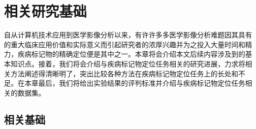 \chapter{相关研究基础}
自从计算机技术应用到医学影像分析以来，有许许多多医学影像分析难题因其具有的重大临床应用价值和实际意义而引起研究者的浓厚兴趣并为之投入大量时间和精力，疾病标记物的精确定位便是其中之一。本章将会介绍本文后续内容涉及到的基本知识点。接着，我们将会介绍与疾病标记物定位任务相关的研究进展，力求将相关方法阐述得清晰明了，突出比较各种方法在疾病标记物定位任务上的长处和不足。在本章最后，我们将给出实验结果的评判标准并介绍与疾病标记物定位任务相关的数据集。

\section{相关基础}

